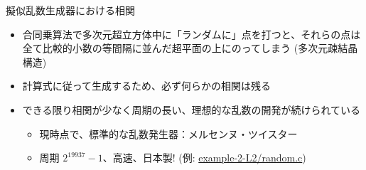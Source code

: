 \begin{frame}[t,fragile]{擬似乱数生成器における相関}
  \begin{itemize}
  \item 合同乗算法で多次元超立方体中に「ランダムに」点を打つと、それらの点は全て比較的小数の等間隔に並んだ超平面の上にのってしまう (多次元疎結晶構造)
  \item 計算式に従って生成するため、必ず何らかの相関は残る
  \item できる限り相関が少なく周期の長い、理想的な乱数の開発が続けられている
    \begin{itemize}
    \item 現時点で、標準的な乱数発生器：メルセンヌ・ツイスター
    \item 周期 $2^{19937}-1$、高速、日本製! (例: \href{https://github.com/todo-group/computer-experiments/blob/master/exercise/monte_carlo/random.c}{example-2-L2/random.c})
    \end{itemize}
  \end{itemize}
\end{frame}

